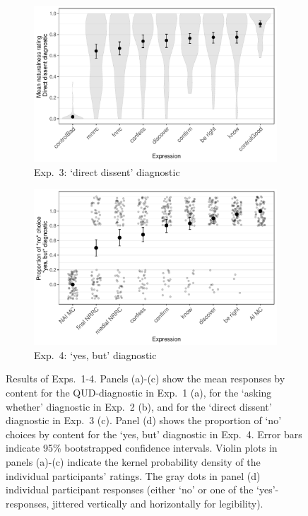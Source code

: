 \documentclass[12pt]{article}
\begin{document}
\begin{figure}[h!]
\begin{subfigure}{.49\textwidth}
\centering
 \includegraphics[width=1\textwidth]{../../results/main/exp3/graphs/mean-ratings.pdf}
 \caption{Exp.~3: `direct dissent' diagnostic}
 \end{subfigure} %
 \begin{subfigure}{.49\textwidth}
\centering
 \includegraphics[width=1\textwidth]{../../results/main/exp4/graphs/mean-ratings.pdf}
 \caption{Exp.~4: `yes, but' diagnostic}
 \end{subfigure}

\caption{Results of Exps.~1-4. Panels (a)-(c) show the mean responses by content for the QUD-diagnostic in Exp.~1 (a), for the `asking whether' diagnostic in Exp.~2 (b), and for the `direct dissent' diagnostic in Exp.~3 (c). Panel (d) shows the proportion of `no' choices by content for the `yes, but' diagnostic in Exp.~4. Error bars indicate 95\% bootstrapped confidence intervals. Violin plots in panels (a)-(c) indicate the kernel probability density of the individual participants’ ratings. The gray dots in panel (d) individual participant responses (either ‘no’ or one of the ‘yes’-responses, jittered vertically and horizontally for legibility).} \label{fig:results}

\end{figure}
\end{document}
